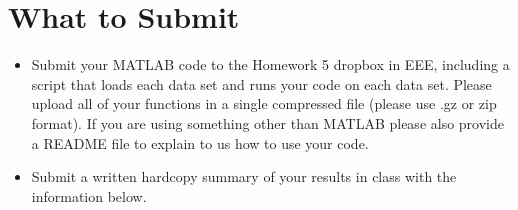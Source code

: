 \documentclass[11pt,psfig]{article}
\begin{document}
\newpage

\section*{What to Submit}

 
\begin{itemize} \item Submit your MATLAB  code to the
Homework 5 dropbox in EEE, including a script that loads each data set and runs your code on each data set. Please upload all of your functions in a single compressed
file (please use .gz or zip format). If you are using something other than MATLAB please also provide a README file to explain to us how to use your code.

\item Submit a written hardcopy summary of your results in class with the information below.
\end{itemize}
\end{document}
